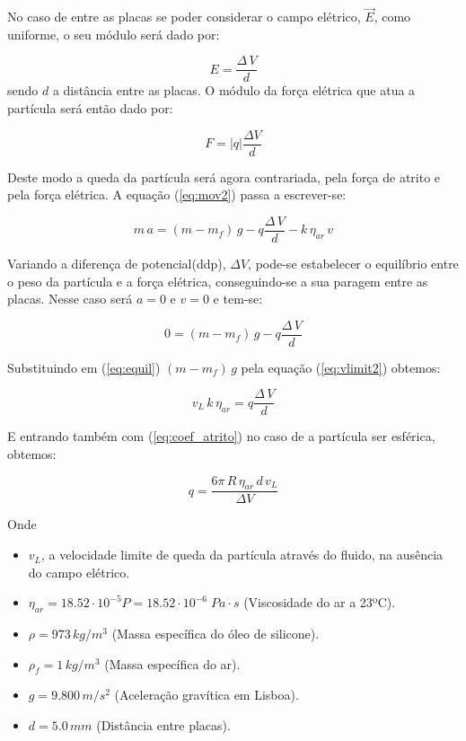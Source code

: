 \documentclass[a4paper,twoside,12pt]{article}      %
\begin{document}
No caso de entre as placas se poder considerar o campo elétrico, $\vec{E}$, como uniforme, o seu módulo será dado por:


\begin{equation*}
	E = \frac{\Delta\, V}{d}
\end{equation*}
sendo $d$ a distância entre as placas. O módulo da força elétrica que atua a partícula será então  dado por: 

\begin{equation*}
	F = |q| \frac{\Delta V}{d}
\end{equation*}

Deste modo a queda da partícula será agora contrariada, pela força de atrito e pela força elétrica. A equação (\ref{eq:mov2}) passa a escrever-se:

\begin{equation}
	\label{eq:mov3}
	m\,a = (m - m_f)\,g  - q \frac{\Delta\, V}{d} - k  \, \eta_{ar} \, v
\end{equation}

Variando a diferença de potencial(ddp), $\Delta V$, pode-se estabelecer o equilíbrio entre o peso da partícula e a força elétrica, conseguindo-se a sua paragem entre as placas. Nesse caso será $a=0$ e $v=0$ e tem-se:

\begin{equation}
	\label{eq:equil}
	0 = (m - m_f)\,g  - q \frac{\Delta\, V}{d} 
\end{equation}

Substituindo em (\ref{eq:equil}) $(m - m_f)\,g$   pela equação (\ref{eq:vlimit2}) obtemos:

\begin{equation*}
	v_L\, k\, \eta_{ar} = q \frac{\Delta\, V}{d}
\end{equation*}

E entrando também com (\ref{eq:coef_atrito}) no caso de a partícula ser esférica, obtemos:

\begin{equation}
	\label{eq:carga}
	q = \frac{6 \pi \, R \, \eta_{ar} \, d\, v_L}{\Delta V}  
\end{equation}

Onde

\begin{itemize}
\item $v_L$, a velocidade limite de queda da partícula através do fluido, na ausência do campo elétrico. 
\item $\eta_{ar} = 18.52 \cdot 10^{-5} P =  18.52 \cdot 10^{-6} \; Pa\cdot s $ (Viscosidade do ar a 23ºC).
\item $\rho = 973 \, kg/m^{3}$ (Massa específica do óleo de silicone).
\item $\rho_f = 1 \, kg/m^{3}$ (Massa específica do ar).
\item $g=9.800\, m/s^{2}$ (Aceleração gravítica em Lisboa).
\item $d=5.0\, mm$ (Distância entre placas).
\end{itemize}
\end{document}
